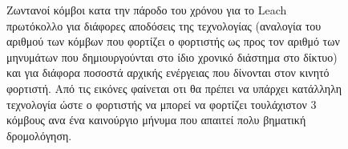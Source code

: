 \begin{figure}[H]
  \centering
  \caption{Ζωντανοί κόμβοι κατα την πάροδο του χρόνου για το Leach πρωτόκολλο για διάφορες αποδόσεις της τεχνολογίας (αναλογία του αριθμού των κόμβων που φορτίζει
ο φορτιστής ως προς τον αριθμό των μηνυμάτων που δημιουργούνται στο ίδιο χρονικό διάστημα στο δίκτυο) και για διάφορα ποσοστά αρχικής ενέργειας που δίνονται στον
κινητό φορτιστή. Από τις εικόνες φαίνεται οτι θα πρέπει να υπάρχει κατάλληλη τεχνολογία ώστε ο φορτιστής να μπορεί να φορτίζει τουλάχιστον 3 κόμβους ανα ένα
καινούργιο μήνυμα που απαιτεί πολυ βηματική δρομολόγηση.}
  \label{fig:5exp_1_2}
\end{figure}


